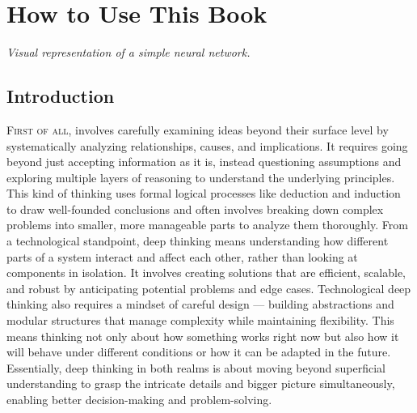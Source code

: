 \documentclass{book}
\begin{document}
\chapter{How to Use This Book}

\begin{center}

\vspace{0.5cm}
{\itshape Visual representation of a simple neural network.}
\end{center}

\section{Introduction}
\lettrine{F}{irst of all}, involves carefully examining ideas beyond their surface level by systematically analyzing relationships, causes, and implications. It requires going beyond just accepting information as it is, instead questioning assumptions and exploring multiple layers of reasoning to understand the underlying principles. This kind of thinking uses formal logical processes like deduction and induction to draw well-founded conclusions and often involves breaking down complex problems into smaller, more manageable parts to analyze them thoroughly. From a technological standpoint, deep thinking means understanding how different parts of a system interact and affect each other, rather than looking at components in isolation. It involves creating solutions that are efficient, scalable, and robust by anticipating potential problems and edge cases. Technological deep thinking also requires a mindset of careful design — building abstractions and modular structures that manage complexity while maintaining flexibility. This means thinking not only about how something works right now but also how it will behave under different conditions or how it can be adapted in the future. Essentially, deep thinking in both realms is about moving beyond superficial understanding to grasp the intricate details and bigger picture simultaneously, enabling better decision-making and problem-solving.
\end{document}
